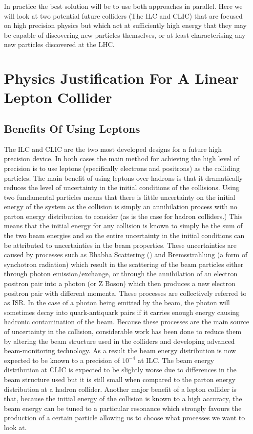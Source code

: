 In practice the best solution will be to use both approaches in parallel. Here we will look at two potential future colliders (The \ac{ILC} and \ac{CLIC}) that are focused on high precision physics but which act at sufficiently high energy that they may be capable of discovering new particles themselves, or at least characterising any new particles discovered at the \ac{LHC}. 

\chapter{Physics Justification For A Linear Lepton Collider}
\section{Benefits Of Using Leptons}
\label{benefits}
The \ac{ILC} and \ac{CLIC} are the two most developed designs for a future high precision device. In both cases the main method for achieving the high level of precision is to use leptons (specifically electrons and positrons) as the colliding particles. The main benefit of using leptons over hadrons is that it dramatically reduces the level of uncertainty in the initial conditions of the collisions. Using two fundamental particles means that there is little uncertainty on the initial energy of the system as the collision is simply an annihilation process with no parton energy distribution to consider (as is the case for hadron colliders.) This means that the initial energy for any collision is known to simply be the sum of the two beam energies and so the entire uncertainty in the initial conditions can be attributed to uncertainties in the beam properties. These uncertainties are caused by processes such as Bhabha Scattering () and Bremsstrahlung (a form of synchotron radiation) which result in the scattering of the beam particles either through photon emission/exchange, or through the annihilation of an electron positron pair into a photon (or Z Boson) which then produces a new electron positron pair with different momenta. These processes are collectively referred to as \ac{ISR}. In the case of a photon being emitted by the beam, the photon will sometimes decay into quark-antiquark pairs if it carries enough energy causing hadronic contamination of the beam. Because these processes are the main source of uncertainty in the collision, considerable work has been done to reduce them by altering the beam structure used in the colliders and developing advanced beam-monitoring technology. As a result the beam energy distribution is now expected to be known to a precision of ${10^{-4}}$ \cite{2009JInst...410015B} at \ac{ILC}.  The beam energy distribution at \ac{CLIC} is expected to be slightly worse due to differences in the beam structure used but it is still small when compared to the parton energy distribution at a hadron collider. Another major benefit of a lepton collider is that, because the initial energy of the collision is known to a high accuracy, the beam energy can be tuned to a particular resonance which strongly favours the production of a certain particle allowing us to choose what processes we want to look at.
